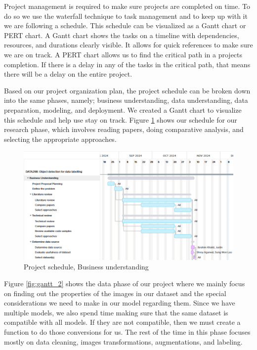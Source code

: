 \documentclass[stu,12pt,floatsintext]{apa7}
\begin{document}
Project management is required to make sure projects are completed on time. To do so we use the waterfall technique to task management and to keep up with it we are following a schedule. This schedule can be visualized as a Gantt chart or PERT chart. A Gantt chart shows the tasks on a timeline with dependencies, resources, and durations clearly visible. It allows for quick references to make sure we are on track. A PERT chart allows us to find the critical path in a projects completion. If there is a delay in any of the tasks in the critical path, that means there will be a delay on the entire project.

Based on our project organization plan, the project schedule can be broken down into the same phases, namely; business understanding, data understanding, data preparation, modeling, and deployment. We created a Gantt chart to visualize this schedule and help use stay on track. Figure \ref{fig:gantt_1} shows our schedule for our research phase, which involves reading papers, doing comparative analysis, and selecting the appropriate approaches.

\begin{figure}[!htb]
    \centering
    \includegraphics[width=\linewidth]{images/gantt/gantt_1.png}
    \caption{Project schedule, Business understanding}
    \label{fig:gantt_1}
\end{figure}

Figure \ref{fig:gantt_2} shows the data phase of our project where we mainly focus on finding out the properties of the images in our dataset and the special considerations we need to make in our model regarding them. Since we have multiple models, we also spend time making sure that the same dataset is compatible with all models. If they are not compatible, then we must create a function to do those conversions for us. The rest of the time in this phase focuses mostly on data cleaning, images transformations, augmentations, and labeling. 
\end{document}
